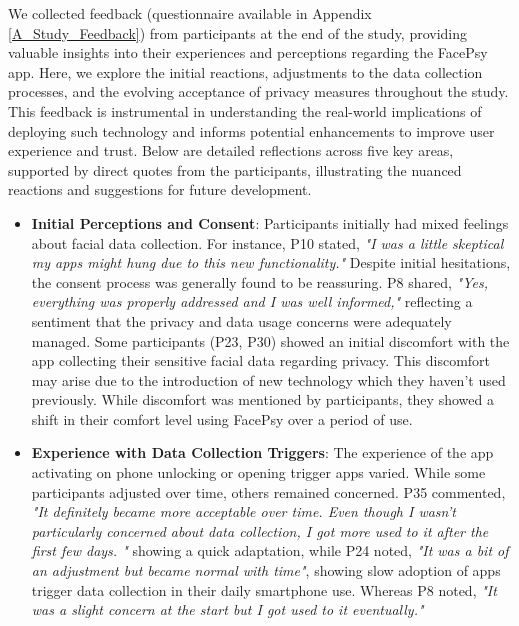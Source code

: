 We collected feedback (questionnaire available in Appendix \ref{A_Study_Feedback})  from participants at the end of the study, providing valuable insights into their experiences and perceptions regarding the FacePsy app. Here, we explore the initial reactions, adjustments to the data collection processes, and the evolving acceptance of privacy measures throughout the study. This feedback is instrumental in understanding the real-world implications of deploying such technology and informs potential enhancements to improve user experience and trust. Below are detailed reflections across five key areas, supported by direct quotes from the participants, illustrating the nuanced reactions and suggestions for future development.

\begin{itemize}
     \item \textbf{Initial Perceptions and Consent}: Participants initially had mixed feelings about facial data collection. For instance, P10 stated, \textit{"I was a little skeptical my apps might hung due to this new functionality."} Despite initial hesitations, the consent process was generally found to be reassuring. P8 shared, \textit{"Yes, everything was properly addressed and I was well informed,"} reflecting a sentiment that the privacy and data usage concerns were adequately managed. Some participants (P23, P30) showed an initial discomfort with the app collecting their sensitive facial data regarding privacy. This discomfort may arise due to the introduction of new technology which they haven't used previously. While discomfort was mentioned by participants, they showed a shift in their comfort level using FacePsy over a period of use. 

    \item \textbf{Experience with Data Collection Triggers}: The experience of the app activating on phone unlocking or opening trigger apps varied. While some participants adjusted over time, others remained concerned. P35 commented, \textit{"It definitely became more acceptable over time. Even though I wasn't particularly concerned about data collection, I got more used to it after the first few days. "} showing a quick adaptation, while P24 noted, \textit{"It was a bit of an adjustment but became normal with time"}, showing slow adoption of apps trigger data collection in their daily smartphone use. Whereas P8 noted, \textit{"It was a slight concern at the start but I got used to it eventually."}


\end{itemize}
